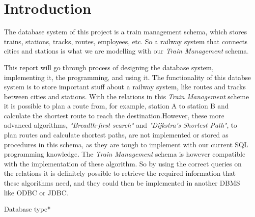 \section{Introduction}

The database system of this project is a train management schema, which stores 
trains, stations, tracks, routes, employees, etc. So a railway system that 
connects cities and stations is what we are modelling with our \emph{Train 
Management} schema.

This report will go through process of designing the database system, 
implementing it, the programming, and using it.
The functionality of this databse system is to store important stuff about a 
railway system, like routes and tracks between cities and stations. With the 
relations in this \emph{Train Management} scheme it is possible to plan a route 
from, for example, station A to station B and calculate the shortest route to 
reach the destination.However, these more advanced algorithms, 
\textit{"Breadth-first search"} and \textit{"Dijkstra's Shortest Path"}, to 
plan routes and calculate shortest paths, are not implemented or stored as 
procedures in this schema, as they are tough to implement with our current SQL 
programming knowledge.
The \emph{Train Management} schema is however compatible with the 
implementation of these algorithm. So by using the correct queries on the 
relations it is definitely possible to retrieve the required information that 
these algorithms need, and they could then be implemented in another DBMS like 
ODBC or JDBC.

Database type* %




